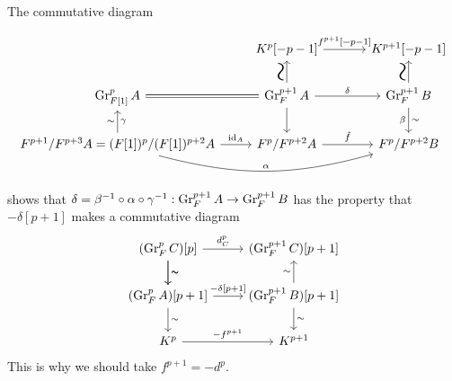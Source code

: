 \documentclass[deligne.tex]{subfiles}
\begin{document}
The commutative diagram
\begin{ceqn}\begin{equation*}\begin{tikzcd}
	&K^p[-p-1]\arrow[r,"{f^{p+1}[-p-1]}"]
	&[10pt]K^{p+1}[-p-1] \\
	\Gr^p_{F[1]}A\arrow[r,equals]
	&\Gr_F^{p+1}A\arrow[r,"\delta"]\arrow[d]\arrow[u,"{\rotatebox{-90}{\text{\Huge$\sim$}}}"]
	&\Gr_F^{p+1}B\arrow[d,"\sim","\beta"']\arrow[u,"{\rotatebox{-90}{\text{\Huge$\sim$}}}"] \\
	F^{p+1}/F^{p+3}A=(F[1])^p/(F[1])^{p+2}A\arrow[u,"\sim","\gamma"']\arrow[r,"\id_A"]\arrow[rr,bend right=15,"\alpha"]
	&F^p/F^{p+2}A\arrow[r,"\tilde f"]&F^p/F^{p+2}B
\end{tikzcd}\end{equation*}\end{ceqn}
shows that
$\delta=\beta^{-1}\circ\alpha\circ\gamma^{-1}:\operatorname{Gr}_F^{p+1}A\rightarrow\operatorname{Gr}_F^{p+1}B$
has the property that $-\delta[p+1]$ makes a commutative diagram
\begin{equation*}\begin{tikzcd}
	(\Gr_F^{p}C)[p]\arrow[d,"\sim"]\arrow[r,"d_C^p"]\arrow[d,"\sim"]
	&(\Gr_F^{p+1}C)[p+1] \\
	(\Gr_F^{p}A)[p+1]\arrow[d,"\sim"]\arrow[r,"{-\delta[p+1]}"]
	&(\Gr_F^{p+1}B)[p+1]\arrow[d,"\sim"]\arrow[u,"\sim"] \\
	K^p\arrow[r,"-f^{p+1}"]&K^{p+1}
\end{tikzcd}\end{equation*}
This is why we should take $f^{p+1}=-d^p$.
\end{document}
